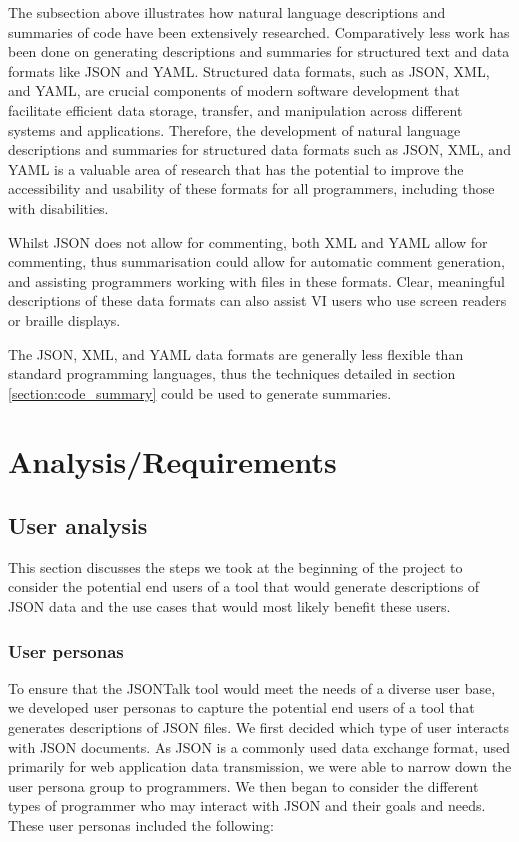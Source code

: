 \documentclass{l4proj}
\begin{document}
The subsection above illustrates how natural language descriptions and summaries of code have been extensively researched. Comparatively less work has been done on generating descriptions and summaries for structured text and data formats like JSON and YAML. Structured data formats, such as JSON, XML, and YAML, are crucial components of modern software development that facilitate efficient data storage, transfer, and manipulation across different systems and applications. Therefore, the development of natural language descriptions and summaries for structured data formats such as JSON, XML, and YAML is a valuable area of research that has the potential to improve the accessibility and usability of these formats for all programmers, including those with disabilities.

Whilst JSON does not allow for commenting, both XML and YAML allow for commenting, thus summarisation could allow for automatic comment generation, and assisting programmers working with files in these formats. Clear, meaningful descriptions of these data formats can also assist VI users who use screen readers or braille displays. 

The JSON, XML, and YAML data formats are generally less flexible than standard programming languages, thus the techniques detailed in section \ref{section:code_summary} could be used to generate summaries.


\chapter{Analysis/Requirements}

\section{User analysis}

This section discusses the steps we took at the beginning of the project to consider the potential end users of a tool that would generate descriptions of JSON data and the use cases that would most likely benefit these users.

\label{subsection: personas}
\subsection{User personas}
To ensure that the JSONTalk tool would meet the needs of a diverse user base, we developed user personas to capture the potential end users of a tool that generates descriptions of JSON files. We first decided which type of user interacts with JSON documents. As JSON is a commonly used data exchange format, used primarily for web application data transmission, we were able to narrow down the user persona group to programmers. We then began to consider the different types of programmer who may interact with JSON and their goals and needs. These user personas included the following: 
\end{document}
